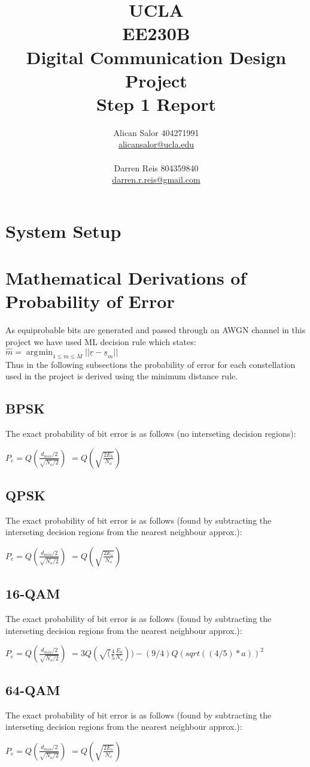 \documentclass[]{article}
\title{UCLA\\EE230B\\Digital Communication Design Project\\Step 1 Report}
\author{Alican Salor 404271991 \\  \href{mailto:alicansalor@ucla.edu}{alicansalor@ucla.edu} \\ \\
Darren Reis 804359840 \\
\href{mailto:darrer.r.reis@gmail.com}{darren.r.reis@gmail.com} }
\DeclareMathOperator*{\argmin}{\arg\!\min}
\begin{document}
\maketitle

\newpage
\tableofcontents

\newpage


\section{System Setup}

\section{Mathematical Derivations of Probability of Error}

As equiprobable bits are generated and passed through an AWGN channel in this project we have used ML decision rule which states: \\

$\hat{m} = \argmin_{1\leq m \leq M}{||\underline{r} - \underline{s}_m||}$ 
\\

Thus in the following subsections the probability of error for each constellation used in the project is derived using the minimum distance rule.


\subsection{BPSK}
The exact probability of bit error is as follows (no interseting decision regions):

$ P_e = Q(\frac{d_{min}/2}{\sqrt{N_o/2}}) $
$       = Q(\sqrt{\frac{2E_b}{N_o}}) $

\subsection{QPSK}

The exact probability of bit error is as follows (found by subtracting the interseting decision regions from the nearest neighbour approx.):

$ P_e = Q(\frac{d_{min}/2}{\sqrt{N_o/2}}) $
$       = Q(\sqrt{\frac{2E_s}{N_o}}) $ 

\subsection{16-QAM}
The exact probability of bit error is as follows (found by subtracting the interseting decision regions from the nearest neighbour approx.):

$ P_e = Q(\frac{d_{min}/2}{\sqrt{N_o/2}}) $
$       = 3Q(\sqrt(\frac{4}{5}\frac{E_b}{N_o}))-(9/4)Q(sqrt((4/5)*a))^2$ 

\subsection{64-QAM}
The exact probability of bit error is as follows (found by subtracting the interseting decision regions from the nearest neighbour approx.):

$ P_e = Q(\frac{d_{min}/2}{\sqrt{N_o/2}}) $
$       = Q(\sqrt{\frac{2E_s}{N_o}}) $ 
\end{document}
